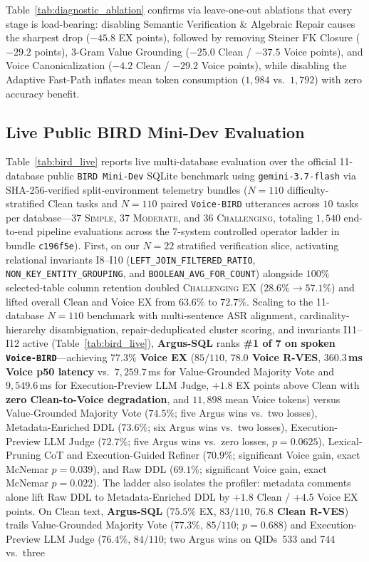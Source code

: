 \documentclass[10pt,twocolumn]{article}
\begin{document}
Table~\ref{tab:diagnostic_ablation} confirms via leave-one-out ablations that every stage is load-bearing: disabling Semantic Verification \& Algebraic Repair causes the sharpest drop ($-45.8$ EX points), followed by removing Steiner FK Closure ($-29.2$ points), 3-Gram Value Grounding ($-25.0$ Clean / $-37.5$ Voice points), and Voice Canonicalization ($-4.2$ Clean / $-29.2$ Voice points), while disabling the Adaptive Fast-Path inflates mean token consumption ($1{,}984$ vs.\ $1{,}792$) with zero accuracy benefit.



\subsection{Live Public BIRD Mini-Dev Evaluation}
Table~\ref{tab:bird_live} reports live multi-database evaluation over the official 11-database public \texttt{BIRD Mini-Dev} SQLite benchmark using \texttt{gemini-3.7-flash} via SHA-256-verified split-environment telemetry bundles ($N=110$ difficulty-stratified Clean tasks and $N=110$ paired \texttt{Voice-BIRD} utterances across $10$ tasks per database—$37$ \textsc{Simple}, $37$ \textsc{Moderate}, and $36$ \textsc{Challenging}, totaling $1{,}540$ end-to-end pipeline evaluations across the 7-system controlled operator ladder in bundle \texttt{c196f5e}). First, on our $N=22$ stratified verification slice, activating relational invariants I8--I10 (\texttt{LEFT\_\allowbreak JOIN\_\allowbreak FILTERED\_\allowbreak RATIO}, \texttt{NON\_\allowbreak KEY\_\allowbreak ENTITY\_\allowbreak GROUPING}, and \texttt{BOOLEAN\_\allowbreak AVG\_\allowbreak FOR\_\allowbreak COUNT}) alongside $100\%$ selected-table column retention doubled \textsc{Challenging} EX ($28.6\% \to 57.1\%$) and lifted overall Clean and Voice EX from $63.6\%$ to $72.7\%$. Scaling to the 11-database $N=110$ benchmark with multi-sentence ASR alignment, cardinality-hierarchy disambiguation, repair-deduplicated cluster scoring, and invariants I11--I12 active (Table~\ref{tab:bird_live}), \textbf{Argus-SQL} ranks \textbf{\#1 of 7 on spoken \texttt{Voice-BIRD}}—achieving \textbf{$77.3\%$ Voice EX} ($85/110$, \textbf{$78.0$ Voice R-VES}, \textbf{$360.3$\,ms Voice p50 latency} vs.\ $7{,}259.7$\,ms for Value-Grounded Majority Vote and $9{,}549.6$\,ms for Execution-Preview LLM Judge, $+1.8$ EX points above Clean with \textbf{zero Clean-to-Voice degradation}, and $11{,}898$ mean Voice tokens) versus Value-Grounded Majority Vote ($74.5\%$; five Argus wins vs.\ two losses), Metadata-Enriched DDL ($73.6\%$; six Argus wins vs.\ two losses), Execution-Preview LLM Judge ($72.7\%$; five Argus wins vs.\ zero losses, $p = 0.0625$), Lexical-Pruning CoT and Execution-Guided Refiner ($70.9\%$; significant Voice gain, exact McNemar $p = 0.039$), and Raw DDL ($69.1\%$; significant Voice gain, exact McNemar $p = 0.022$). The ladder also isolates the profiler: metadata comments alone lift Raw DDL to Metadata-Enriched DDL by $+1.8$ Clean / $+4.5$ Voice EX points. On Clean text, \textbf{Argus-SQL} ($75.5\%$ EX, $83/110$, \textbf{$76.8$ Clean R-VES}) trails Value-Grounded Majority Vote ($77.3\%$, $85/110$; $p = 0.688$) and Execution-Preview LLM Judge ($76.4\%$, $84/110$; two Argus wins on QIDs~533 and 744 vs.\ three 
\end{document}

